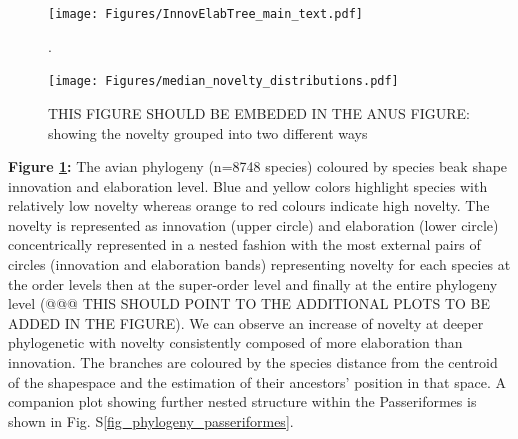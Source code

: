 \documentclass[12pt,letterpaper]{article}
\begin{document}
\begin{figure}[!htbp]
\centering
    \texttt{[image: Figures/InnovElabTree\_main\_text.pdf]}
\caption{.}
\label{Fig:phylogeny}
\end{figure}

\begin{figure}[!htbp]
\centering
    \texttt{[image: Figures/median\_novelty\_distributions.pdf]}
\caption{THIS FIGURE SHOULD BE EMBEDED IN THE ANUS FIGURE: showing the novelty grouped into two different ways}
\label{Fig:phylogeny_2}
\end{figure}

\bigskip

\noindent \textbf{Figure \ref{Fig:phylogeny}:} The avian phylogeny (n=8748 species) coloured by species beak shape innovation and elaboration level.
Blue and yellow colors highlight species with relatively low novelty whereas orange to red colours indicate high novelty.
The novelty is represented as innovation (upper circle) and elaboration (lower circle) concentrically represented in a nested fashion with the most external pairs of circles (innovation and elaboration bands) representing novelty for each species at the order levels then at the super-order level and finally at the entire phylogeny level (@@@ THIS SHOULD POINT TO THE ADDITIONAL PLOTS TO BE ADDED IN THE FIGURE).
We can observe an increase of novelty at deeper phylogenetic with novelty consistently composed of more elaboration than innovation.
The branches are coloured by the species distance from the centroid of the shapespace and the estimation of their ancestors' position in that space.
A companion plot showing further nested structure within the Passeriformes is shown in Fig. S\ref{fig_phylogeny_passeriformes}.
\end{document}
